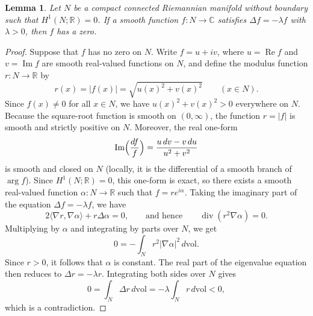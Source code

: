 \documentclass[11pt,reqno]{amsart}
\newtheorem{lemma}[theorem]{Lemma}
\theoremstyle{remark}
\newcommand{\R}{\mathbb R}
\newcommand{\C}{\mathbb C}
\begin{document}
\begin{lemma}\label{conv-eigenzero}
Let $N$ be a compact connected Riemannian manifold without boundary
such that $H^1(N;\R)=0$. If a smooth function $f:N\to\C$ satisfies
$\Delta f=-\lambda f$ with $\lambda>0$, then $f$ has a zero.
\end{lemma}
\begin{proof}
Suppose that $f$ has no zero on $N$. Write $f=u+iv$, where
$u=\operatorname{Re}f$ and $v=\operatorname{Im}f$ are smooth real-valued
functions on $N$, and define the modulus function $r:N\to\R$ by
\[
 r(x)=|f(x)|=\sqrt{u(x)^2+v(x)^2}\qquad(x\in N).
\]
Since $f(x)\ne0$ for all $x\in N$, we have $u(x)^2+v(x)^2>0$ everywhere
on $N$. Because the square-root function is smooth on $(0,\infty)$, the
function $r=|f|$ is smooth and strictly positive on $N$. Moreover, the
real one-form
\[
 \operatorname{Im}\Bigl(\frac{df}{f}\Bigr)=\frac{u\,dv-v\,du}{u^2+v^2}
\]
is smooth and closed on $N$ (locally, it is the differential of a smooth
branch of $\arg f$). Since $H^1(N;\R)=0$, this one-form is exact, so
there exists a smooth real-valued function $\alpha:N\to\R$ such that
$f=r e^{i\alpha}$. Taking the imaginary part of the equation
$\Delta f=-\lambda f$, we have
\[
 2\langle\nabla r,\nabla\alpha\rangle+r\Delta\alpha=0,
 \qquad\text{and hence}\qquad
 \operatorname{div}(r^2\nabla\alpha)=0.
\]
Multiplying by $\alpha$ and integrating by parts over $N$, we get
\[
 0=-\int_N r^2|\nabla\alpha|^2\,d\mathrm{vol}.
\]
Since $r>0$, it follows that $\alpha$ is constant. The real part of the
eigenvalue equation then reduces to $\Delta r=-\lambda r$. Integrating
both sides over $N$ gives
\[
 0=\int_N \Delta r\,d\mathrm{vol}=-\lambda\int_N r\,d\mathrm{vol}<0,
\]
which is a contradiction.
\end{proof}
\end{document}
